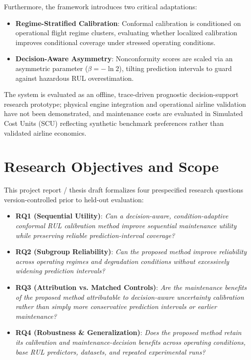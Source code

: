 Furthermore, the framework introduces two critical adaptations:
\begin{itemize}
    \item \textbf{Regime-Stratified Calibration}: Conformal calibration is conditioned on operational flight regime clusters, evaluating whether localized calibration improves conditional coverage under stressed operating conditions.
    \item \textbf{Decision-Aware Asymmetry}: Nonconformity scores are scaled via an asymmetric parameter ($\beta = -\ln 2$), tilting prediction intervals to guard against hazardous RUL overestimation.
\end{itemize}
The system is evaluated as an offline, trace-driven prognostic decision-support research prototype; physical engine integration and operational airline validation have not been demonstrated, and maintenance costs are evaluated in Simulated Cost Units (SCU) reflecting synthetic benchmark preferences rather than validated airline economics.

\section{Research Objectives and Scope}
This project report / thesis draft formalizes four prespecified research questions version-controlled prior to held-out evaluation:
\begin{itemize}
    \item \textbf{RQ1 (Sequential Utility)}: \textit{Can a decision-aware, condition-adaptive conformal RUL calibration method improve sequential maintenance utility while preserving reliable prediction-interval coverage?}
    \item \textbf{RQ2 (Subgroup Reliability)}: \textit{Can the proposed method improve reliability across operating regimes and degradation conditions without excessively widening prediction intervals?}
    \item \textbf{RQ3 (Attribution vs. Matched Controls)}: \textit{Are the maintenance benefits of the proposed method attributable to decision-aware uncertainty calibration rather than simply more conservative prediction intervals or earlier maintenance?}
    \item \textbf{RQ4 (Robustness \& Generalization)}: \textit{Does the proposed method retain its calibration and maintenance-decision benefits across operating conditions, base RUL predictors, datasets, and repeated experimental runs?}
\end{itemize}

